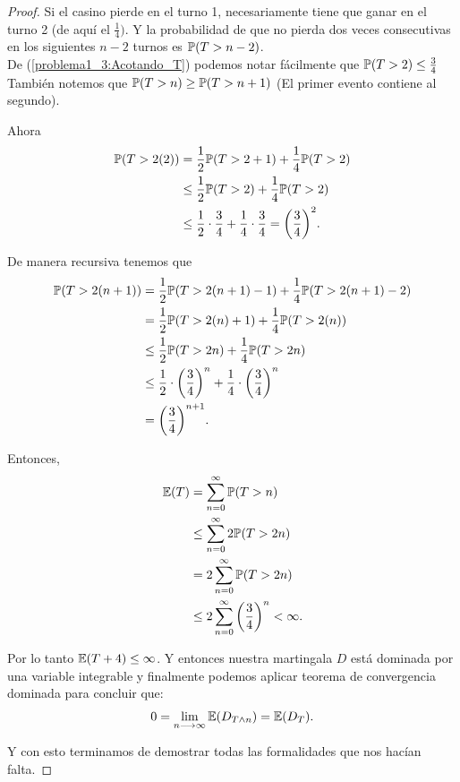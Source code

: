 \begin{proof}
		Si el casino pierde en el turno 1, necesariamente tiene que ganar en el turno 2 (de aquí el ${\frac{1}{4})}$. Y la probabilidad
		de que no pierda dos veces consecutivas en los siguientes ${n-2}$ turnos es ${\mathbb{P}(T > n-2)}$.\\					    
		
		De (\ref{problema1_3:Acotando_T}) podemos notar fácilmente que ${\mathbb{P}(T > 2) \leq \frac{3}{4}}$\\
		
		También notemos que ${\mathbb{P}(T > n ) \geq \mathbb{P}(T > n + 1)}$ (El primer evento contiene al segundo).
		
		Ahora
		\begin{align}
			\mathbb{P}(T > 2 (2)) &=     \frac{1}{2} \mathbb{P}(T > 2+1) + \frac{1}{4} \mathbb{P}(T > 2) \\
						   &\leq  \frac{1}{2} \mathbb{P}(T > 2) + \frac{1}{4} \mathbb{P}(T > 2) \\
						   &\leq  \frac{1}{2} \cdot \frac{3}{4} + \frac{1}{4} \cdot \frac{3}{4} = \bigg(\frac{3}{4}\bigg)^2.
		\end{align}
		
		De manera recursiva tenemos que
		\begin{align}
			\mathbb{P}(T > 2(n+1)) &=     	\frac{1}{2} \mathbb{P}(T > 2(n+1) - 1) + \frac{1}{4} \mathbb{P}(T > 2(n+1) - 2) \\
							&=     	\frac{1}{2} \mathbb{P}(T > 2(n) + 1) + \frac{1}{4} \mathbb{P}(T > 2(n)) \\
							&\leq  	\frac{1}{2} \mathbb{P}(T > 2n) + \frac{1}{4} \mathbb{P}(T > 2n) \\
							&\leq  	\frac{1}{2} \cdot \bigg(\frac{3}{4}\bigg)^{n} + \frac{1}{4} \cdot \bigg(\frac{3}{4}\bigg)^{n} \\
							&=		\bigg(\frac{3}{4}\bigg)^{n+1}.
		\end{align}
		
		Entonces,
		\begin{align}
			\mathbb{E}(T) 	&= 		\sum_{n=0}^\infty \mathbb{P}(T > n) \\
					&\leq 	\sum_{n=0}^\infty 2\mathbb{P}(T > 2n) \\
					&= 		2 \sum_{n=0}^\infty \mathbb{P}(T > 2n) \\
					&\leq 	2 \sum_{n=0}^\infty \bigg(\frac{3}{4}\bigg)^{n} < \infty.
		\end{align}
		
		Por lo tanto ${\mathbb{E}(T + 4) \leq \infty}$. Y entonces nuestra martingala ${D}$ está dominada por una variable integrable y finalmente
		podemos aplicar teorema de convergencia dominada para concluir que:
		\begin{align}
			0 = \lim_{n \longrightarrow \infty} \mathbb{E}(D_{T \wedge n}) = \mathbb{E}(D_T).
		\end{align}
		
		Y con esto terminamos de demostrar todas las formalidades que nos hacían falta.
\end{proof}